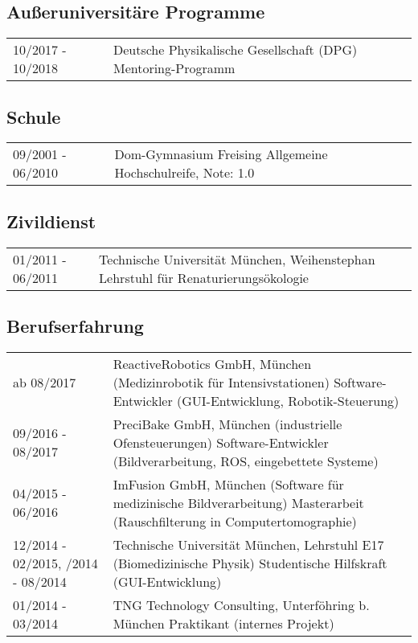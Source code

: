 \documentclass[a4paper,10pt]{memoir}
\begin{document}
\subsection*{Außeruniversitäre Programme}
\vspace*{-\baselineskip}
\begin{longtable}{@{}p{} p{}}
  10/2017 - 10/2018 &
  Deutsche Physikalische Gesellschaft (DPG) \newline
  Mentoring-Programm
\end{longtable}

\subsection*{Schule}
\vspace*{-\baselineskip}
\begin{longtable}{@{}p{} p{}}
  09/2001 - 06/2010 &
  Dom-Gymnasium Freising  \newline
  Allgemeine Hochschulreife, Note: 1.0
\end{longtable}

\subsection*{Zivildienst}
\vspace*{-\baselineskip}
\begin{longtable}{@{}p{} p{}}
  01/2011 - 06/2011 &
  Technische Universität München, Weihenstephan \newline
  Lehrstuhl für Renaturierungsökologie
\end{longtable}

\subsection*{Berufserfahrung}
\vspace*{-\baselineskip}
\begin{longtable}{@{}p{} p{}}
  ab 08/2017 &
  ReactiveRobotics GmbH, München (Medizinrobotik für Intensivstationen) \newline
  Software-Entwickler (GUI-Entwicklung, Robotik-Steuerung)
  \\
  09/2016 - 08/2017 &
  PreciBake GmbH, München (industrielle Ofensteuerungen) \newline
  Software-Entwickler (Bildverarbeitung, ROS, eingebettete Systeme)
  \\
  04/2015 - 06/2016 &
  ImFusion GmbH, München (Software für medizinische Bildverarbeitung) \newline
  Masterarbeit (Rauschfilterung in Computertomographie)
  \\
  12/2014 - 02/2015, \newline
  06/2014 - 08/2014 &
  Technische Universität München, Lehrstuhl E17 (Biomedizinische Physik) \newline
  Studentische Hilfskraft (GUI-Entwicklung)
  \\
  01/2014 - 03/2014 &
  TNG Technology Consulting, Unterföhring b. München \newline
  Praktikant (internes Projekt)
\end{longtable}
\end{document}

